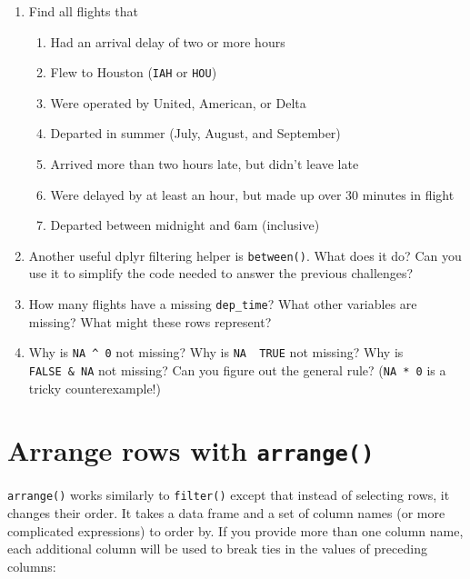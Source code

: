 \documentclass[]{book}
\providecommand{\tightlist}{%
  \setlength{\itemsep}{0pt}\setlength{\parskip}{0pt}}
\begin{document}
\begin{enumerate}
\def\labelenumi{\arabic{enumi}.}
\item
  Find all flights that

  \begin{enumerate}
  \def\labelenumii{\arabic{enumii}.}
  \tightlist
  \item
    Had an arrival delay of two or more hours
  \item
    Flew to Houston (\texttt{IAH} or \texttt{HOU})
  \item
    Were operated by United, American, or Delta
  \item
    Departed in summer (July, August, and September)
  \item
    Arrived more than two hours late, but didn't leave late
  \item
    Were delayed by at least an hour, but made up over 30 minutes in
    flight
  \item
    Departed between midnight and 6am (inclusive)
  \end{enumerate}
\item
  Another useful dplyr filtering helper is \texttt{between()}. What does
  it do? Can you use it to simplify the code needed to answer the
  previous challenges?
\item
  How many flights have a missing \texttt{dep\_time}? What other
  variables are missing? What might these rows represent?
\item
  Why is \texttt{NA\ \^{}\ 0} not missing? Why is
  \texttt{NA\ \textbar{}\ TRUE} not missing? Why is
  \texttt{FALSE\ \&\ NA} not missing? Can you figure out the general
  rule? (\texttt{NA\ *\ 0} is a tricky counterexample!)
\end{enumerate}

\section{\texorpdfstring{Arrange rows with
\texttt{arrange()}}{Arrange rows with arrange()}}\label{arrange-rows-with-arrange}

\texttt{arrange()} works similarly to \texttt{filter()} except that
instead of selecting rows, it changes their order. It takes a data frame
and a set of column names (or more complicated expressions) to order by.
If you provide more than one column name, each additional column will be
used to break ties in the values of preceding columns:
\end{document}
